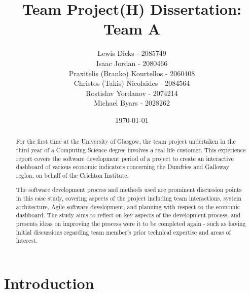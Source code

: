 \documentclass{l3proj}
\begin{document}
\title{Team Project(H) Dissertation: Team A}

\author{Lewis Dicks - 2085749 \\
        Isaac Jordan - 2080466 \\
        Praxitelis (Branko) Kourtellos - 2060408 \\
        Christos (Takis) Nicolaides - 2084564  \\
        Rostislav Yordanov - 2074214 \\
        Michael Byars - 2028262}

\date{\today}

\maketitle

\begin{abstract}

For the first time at the University of Glasgow, the team project undertaken in the third year of a Computing Science degree involves a real life customer. This experience report covers the software development period of a project to create an interactive dashboard of various economic indicators concerning the Dumfries and Galloway region, on behalf of the Crichton Institute.

The software development process and methods used are prominent discussion points in this case study, covering aspects of the project including team interactions, system architecture, Agile software development, and planning with respect to the economic dashboard. The study aims to reflect on key aspects of the development process, and presents ideas on improving the process were it to be completed again - such as having initial discussions regarding team member's prior technical expertise and areas of interest.

\end{abstract}

\educationalconsent

\newpage

\section{Introduction}
\label{sec:introduction}
\end{document}
